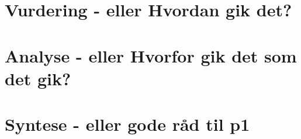 \section{Vurdering - eller Hvordan gik det?}



\section{Analyse - eller Hvorfor gik det som det gik?}



\section{Syntese - eller gode råd til p1}








